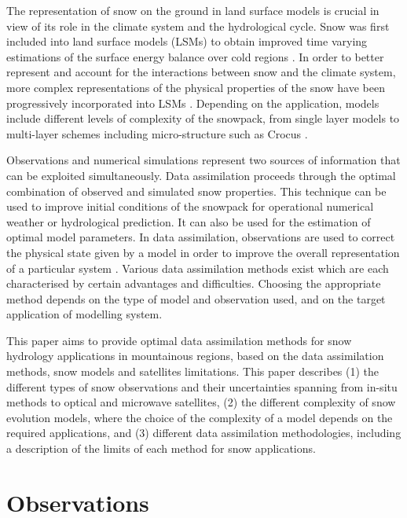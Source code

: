 \documentclass[hydrology,article,submit,moreauthors,pdftex]{Definitions/mdpi}
\begin{document}
The representation of snow on the ground in land surface models is crucial in view of its role in the climate system and the hydrological cycle. Snow was first included into land surface models (LSMs) to obtain improved time varying estimations of the surface energy balance over cold regions \cite{Loth_1993,Lynch_1994,Douville_1995,Yang_1998,Slater_1998}. In order to better represent and account for the interactions between snow and the climate system, more complex representations of the physical properties of the snow have been progressively incorporated into LSMs \citep{Brun_1992,Lehning_1999,Boone_2001}. %
Depending on the application, models include different levels of complexity of the snowpack, from single layer models to multi-layer schemes including micro-structure such as Crocus \citep{Vionnet_2012}.

Observations and numerical simulations represent two sources of information that can be exploited simultaneously. Data assimilation proceeds through the optimal combination of observed and simulated snow properties. This technique can be used to improve initial conditions of the snowpack for operational numerical weather or hydrological prediction. It can also be used for the estimation of optimal model parameters. In data assimilation, observations are used to correct the physical state given by a model in order to improve the overall representation of a particular system \cite{Andreadis_2006,Clark_2006,Leisenring_2011,Nagler_2008,Liu_2013}.
Various data assimilation methods exist which are each characterised by certain advantages and difficulties. Choosing the appropriate method depends on the type of model and observation used, and on the target application of modelling system.

This paper aims to provide optimal data assimilation methods for snow hydrology applications in mountainous regions, based on the data assimilation methods, snow models and satellites limitations. This paper describes (1) the different types of snow observations and their uncertainties spanning from in-situ methods to optical and microwave satellites, (2) the different complexity of snow evolution models, where the choice of the complexity of a model depends on the required applications, and  (3) different data assimilation methodologies, including a description of the limits of each method for snow applications. %


\section{Observations}
\end{document}
